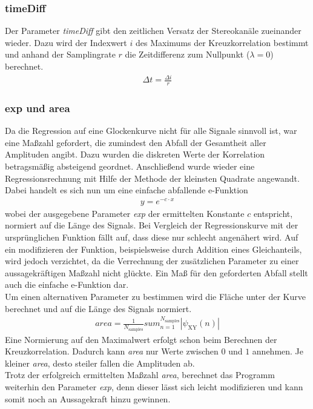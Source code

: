 \subsubsection{timeDiff}
Der Parameter \textit{timeDiff} gibt den zeitlichen Versatz der Stereokanäle zueinander wieder. Dazu wird der Indexwert $i$ des Maximums der Kreuzkorrelation bestimmt und anhand der Samplingrate $r$ die Zeitdifferenz zum Nullpunkt ($\lambda = 0$) berechnet.
\begin{align*}
\Delta t = \frac{\Delta i}{r}
\end{align*}
\subsubsection{exp und area}
Da die Regression auf eine Glockenkurve nicht für alle Signale sinnvoll ist, war eine Maßzahl gefordert, die zumindest den Abfall der Gesamtheit aller Amplituden angibt. Dazu wurden die diskreten Werte der Korrelation betragsmäßig absteigend geordnet. Anschließend wurde wieder eine Regressionsrechnung mit Hilfe der Methode der kleinsten Quadrate angewandt. Dabei handelt es sich nun um eine einfache abfallende e-Funktion
\begin{align*}
y = e^{-c \cdot x}
\end{align*}
wobei der ausgegebene Parameter \textit{exp} der ermittelten Konstante $c$ entspricht, normiert auf die Länge des Signals. Bei Vergleich der Regressionskurve mit der ursprünglichen Funktion fällt auf, dass diese nur schlecht angenähert wird. Auf ein modifizieren der Funktion, beispielsweise durch Addition eines Gleichanteils, wird jedoch verzichtet, da die Verrechnung der zusätzlichen Parameter zu einer aussagekräftigen Maßzahl nicht glückte. Ein Maß für den geforderten Abfall stellt auch die einfache e-Funktion dar. 
\\Um einen alternativen Parameter zu bestimmen wird die Fläche unter der Kurve berechnet und auf die Länge des Signals normiert. 
\begin{align*}
area = \frac{1}{N_{\text{samples}}} sum_{n=1}^{N_{\text{samples}}} |\psi_{\text{XY}}(n)|
\end{align*}
Eine Normierung auf den Maximalwert erfolgt schon beim Berechnen der Kreuzkorrelation. Dadurch kann \textit{area} nur Werte zwischen $0$ und $1$ annehmen. Je kleiner \textit{area}, desto steiler fallen die Amplituden ab. 
\\Trotz der erfolgreich ermittelten Maßzahl \textit{area}, berechnet das Programm weiterhin den Parameter \textit{exp}, denn dieser lässt sich leicht modifizieren und kann somit noch an Aussagekraft hinzu gewinnen. 
